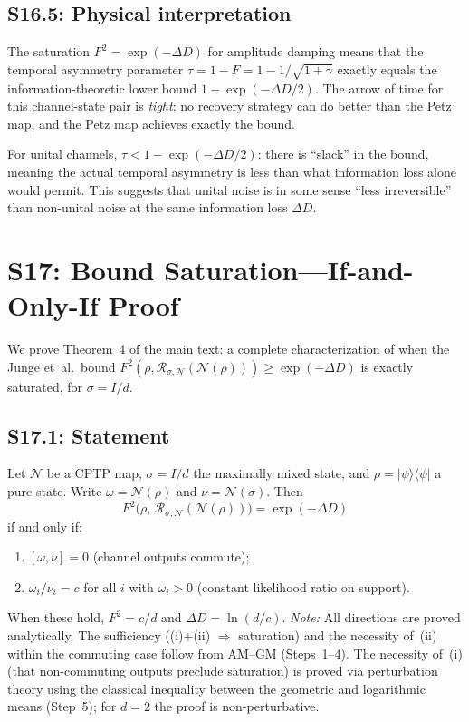 \documentclass[prl,twocolumn,superscriptaddress,longbibliography]{revtex4-2}
\newcommand{\Petz}{\mathcal{R}}
\newcommand{\chan}{\mathcal{N}}
\newcommand{\ket}[1]{|#1\rangle}
\newcommand{\bra}[1]{\langle#1|}
\newcommand{\tauasym}{\tau}
\begin{document}
\subsection{S16.5: Physical interpretation}

The saturation $F^2 = \exp(-\Delta D)$ for amplitude damping
means that the temporal asymmetry parameter
$\tauasym = 1 - F = 1 - 1/\sqrt{1+\gamma}$ exactly equals the
information-theoretic lower bound $1 - \exp(-\Delta D/2)$.
The arrow of time for this channel-state pair is \emph{tight}:
no recovery strategy can do better than the Petz map, and the
Petz map achieves exactly the bound.

For unital channels, $\tauasym < 1 - \exp(-\Delta D/2)$:
there is ``slack'' in the bound, meaning the actual temporal
asymmetry is less than what information loss alone would permit.
This suggests that unital noise is in some sense ``less
irreversible'' than non-unital noise at the same information
loss $\Delta D$.

\section{S17: Bound Saturation---If-and-Only-If Proof}
\label{sec:S17}

We prove Theorem~4 of the main text: a complete characterization
of when the Junge et~al.\ bound
$F^2(\rho,\Petz_{\sigma,\chan}(\chan(\rho))) \geq \exp(-\Delta D)$
is exactly saturated, for $\sigma = I/d$.

\subsection{S17.1: Statement}

Let $\chan$ be a CPTP map, $\sigma = I/d$ the maximally mixed
state, and $\rho = \ket{\psi}\!\bra{\psi}$ a pure state.
Write $\omega = \chan(\rho)$ and $\nu = \chan(\sigma)$.  Then
\begin{equation}
F^2\!\big(\rho,\,\Petz_{\sigma,\chan}(\chan(\rho))\big)
= \exp(-\Delta D)
\end{equation}
if and only if:
\begin{enumerate}
\item[(i)] $[\omega, \nu] = 0$ (channel outputs commute);
\item[(ii)] $\omega_i/\nu_i = c$ for all $i$ with
  $\omega_i > 0$ (constant likelihood ratio on support).
\end{enumerate}
When these hold, $F^2 = c/d$ and $\Delta D = \ln(d/c)$.
\emph{Note:} All directions are proved analytically.
The sufficiency ((i)+(ii) $\Rightarrow$ saturation) and the
necessity of~(ii) within the commuting case follow from AM--GM
(Steps~1--4).
The necessity of~(i) (that non-commuting outputs preclude
saturation) is proved via perturbation theory using the classical
inequality between the geometric and logarithmic means (Step~5);
for $d = 2$ the proof is non-perturbative.
\end{document}
